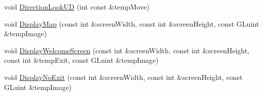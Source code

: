 \begin{DoxyCompactItemize}
\item 
void \hyperlink{class_camera_a7271df5741bcbe72f464729f8d80ad43}{Direction\+Look\+UD} (int const \&temp\+Move)
\item 
void \hyperlink{class_camera_adc12edf020e48254432214200f8e63c3}{Display\+Map} (const int \&screen\+Width, const int \&screen\+Height, const G\+Luint \&temp\+Image)
\item 
void \hyperlink{class_camera_ab8084e679b9cf9bf9a6e333ca8a0caee}{Display\+Welcome\+Screen} (const int \&screen\+Width, const int \&screen\+Height, const int \&temp\+Exit, const G\+Luint \&temp\+Image)
\item 
void \hyperlink{class_camera_a182d23d247e640ba1ed267332a8a6dd0}{Display\+No\+Exit} (const int \&screen\+Width, const int \&screen\+Height, const G\+Luint \&temp\+Image)
\end{DoxyCompactItemize}
